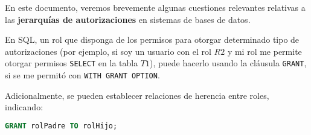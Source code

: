 \documentclass[12pt, a4paper]{article}
\title{\size{15pt}{Jerarquías de autorizaciones} \vspace{-2ex}}
\date{\vspace{-5ex}}
\begin{document}
\maketitle
\thispagestyle{empty}

\vspace{-10ex}

En este documento, veremos brevemente algunas cuestiones relevantes relativas a las \textbf{jerarquías de autorizaciones} en sistemas de bases de datos.

En SQL, un rol que disponga de los permisos para otorgar determinado tipo de autorizaciones (por ejemplo, si soy un usuario con el rol $R2$ y mi rol me permite otorgar permisos \texttt{SELECT} en la tabla $T1$), puede hacerlo usando la cláusula \texttt{GRANT}, si se me permitó con \texttt{WITH GRANT OPTION}.

Adicionalmente, se pueden establecer relaciones de herencia entre roles, indicando:

\begin{center}
\begin{minipage}[c]{0,7\textwidth}
\begin{lstlisting}[language=SQL]
GRANT rolPadre TO rolHijo;
\end{lstlisting}
\end{minipage}
\end{center}
\end{document}
